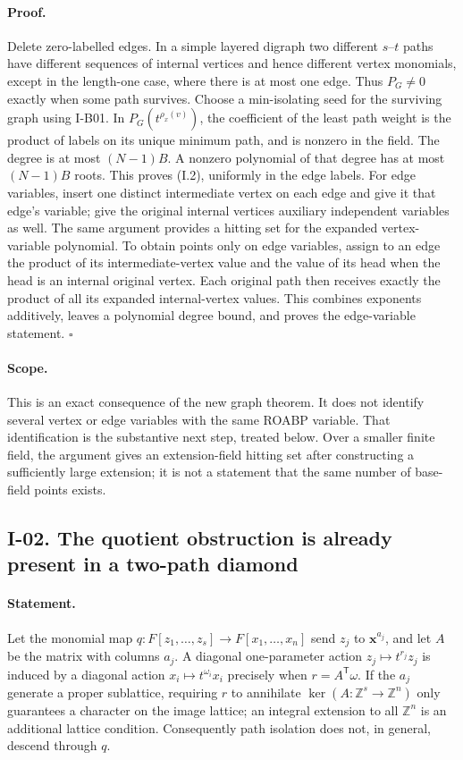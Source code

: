 \documentclass[11pt,a4paper]{article}
\theoremstyle{definition}\newtheorem{definition}{Definition}
\begin{document}
\paragraph{Proof.}
Delete zero-labelled edges.  In a simple layered digraph two different
$s$--$t$ paths have different sequences of internal vertices and hence
different vertex monomials, except in the length-one case, where there
is at most one edge.  Thus $P_G\ne0$ exactly when some path survives.
Choose a min-isolating seed for the surviving graph using I-B01.  In
$P_G(t^{\rho_x(v)})$, the coefficient of the least path weight is the
product of labels on its unique minimum path, and is nonzero in the
field.  The degree is at most $(N-1)B$.  A nonzero polynomial of that
degree has at most $(N-1)B$ roots.  This proves (I.2), uniformly in the
edge labels.  For edge variables, insert one distinct intermediate
vertex on each edge and give it that edge's variable; give the original
internal vertices auxiliary independent variables as well.  The same
argument provides a hitting set for the expanded vertex-variable
polynomial.  To obtain points only on edge variables, assign to an edge
the product of its intermediate-vertex value and the value of its head
when the head is an internal original vertex.  Each original path then
receives exactly the product of all its expanded internal-vertex values.
This combines exponents additively, leaves a polynomial degree bound,
and proves the edge-variable statement. \hfill$\square$

\paragraph{Scope.}
This is an exact consequence of the new graph theorem.  It does not
identify several vertex or edge variables with the same ROABP variable.
That identification is the substantive next step, treated below.
Over a smaller finite field, the argument gives an extension-field
hitting set after constructing a sufficiently large extension; it is
not a statement that the same number of base-field points exists.

\subsection{I-02. The quotient obstruction is already present in a two-path diamond}
\label{I-02}

\paragraph{Statement.}
Let the monomial map $q:F[z_1,\ldots,z_s]\longrightarrow
F[x_1,\ldots,x_n]$ send $z_j$ to $\mathbf x^{a_j}$, and let $A$ be
the matrix with columns $a_j$.  A diagonal one-parameter action
$z_j\mapsto t^{r_j}z_j$ is induced by a diagonal action
$x_i\mapsto t^{\omega_i}x_i$ precisely when
$r=A^{\mathsf T}\omega$.  If the $a_j$ generate a proper sublattice,
requiring $r$ to annihilate $\ker(A:\mathbb Z^s\to\mathbb Z^n)$
only guarantees a character on the image lattice; an integral
extension to all $\mathbb Z^n$ is an additional lattice condition.
Consequently path isolation does not, in general, descend through $q$.
\end{document}
